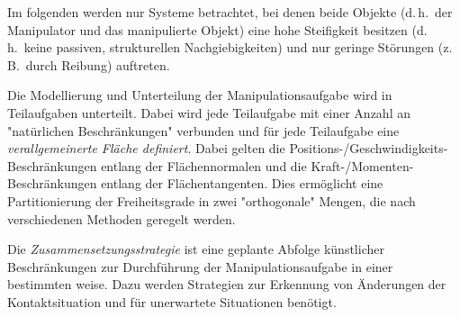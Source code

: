 \documentclass[a4paper, 11pt, accentcolor = tud3b]{tudreport}
\renewcommand{\dh}{d.\,h.~}
\newcommand{\zB}{z.\,B.~}
\begin{document}
			Im folgenden werden nur Systeme betrachtet, bei denen beide Objekte (\dh der Manipulator und das manipulierte Objekt) eine hohe Steifigkeit besitzen (\dh keine passiven, strukturellen Nachgiebigkeiten) und nur geringe Störungen (\zB durch Reibung) auftreten.
			
			Die Modellierung und Unterteilung der Manipulationsaufgabe wird in Teilaufgaben unterteilt. Dabei wird jede Teilaufgabe mit einer Anzahl an "natürlichen Beschränkungen" verbunden und für jede Teilaufgabe eine \emph{verallgemeinerte Fläche definiert}. Dabei gelten die Positions-/Geschwindigkeits-Beschränkungen entlang der Flächennormalen und die Kraft-/Momenten-Beschränkungen entlang der Flächentangenten. Dies ermöglicht eine Partitionierung der Freiheitsgrade in zwei "orthogonale" Mengen, die nach verschiedenen Methoden geregelt werden.
			
			Die \emph{Zusammensetzungsstrategie} ist eine geplante Abfolge künstlicher Beschränkungen zur Durchführung der Manipulationsaufgabe in einer bestimmten weise. Dazu werden Strategien zur Erkennung von Änderungen der Kontaktsituation und für unerwartete Situationen benötigt.
			
\end{document}
